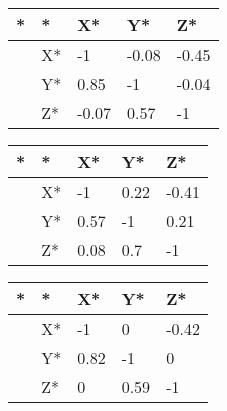 \documentclass[10pt,a4paper]{article}
\begin{document}
\begin{table}[ht]
\centering
\begin{tabular}{lllll}
  \hline
* & * & X* & Y* & Z* \\ 
  \hline
 & X* & -1 & -0.08 & -0.45 \\ 
   & Y* & 0.85 & -1 & -0.04 \\ 
   & Z* & -0.07 & 0.57 & -1 \\ 
   \hline
\end{tabular}
\end{table}

\begin{table}[ht]
\centering
\begin{tabular}{lllll}
  \hline
* & * & X* & Y* & Z* \\ 
  \hline
 & X* & -1 & 0.22 & -0.41 \\ 
   & Y* & 0.57 & -1 & 0.21 \\ 
   & Z* & 0.08 & 0.7 & -1 \\ 
   \hline
\end{tabular}
\end{table}

\begin{table}[ht]
\centering
\begin{tabular}{lllll}
  \hline
* & * & X* & Y* & Z* \\ 
  \hline
 & X* & -1 & 0 & -0.42 \\ 
   & Y* & 0.82 & -1 & 0 \\ 
   & Z* & 0 & 0.59 & -1 \\ 
   \hline
\end{tabular}
\end{table}
 
\end{document}
